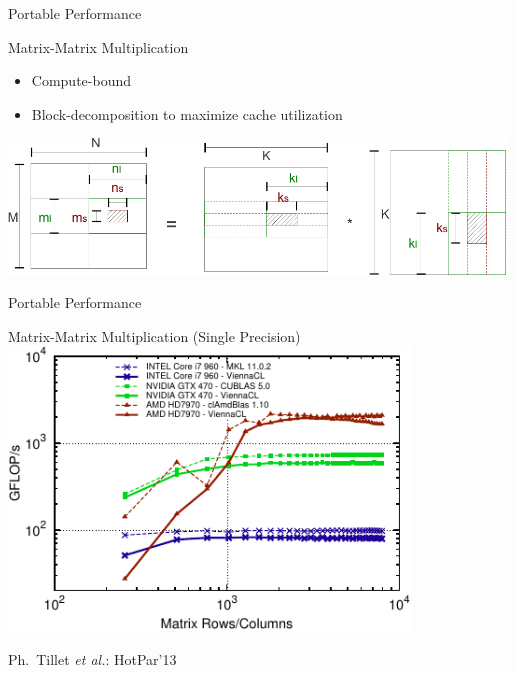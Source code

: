 


\begin{frame}{Portable Performance}
  \begin{block}{Matrix-Matrix Multiplication}
    \begin{itemize}
     \item Compute-bound
     \item Block-decomposition to maximize cache utilization
    \end{itemize}
  \end{block}
  
  \begin{center}
   \includegraphics[width=0.99\textwidth]{figures/MatrixMatrixProduct}
  \end{center}


\end{frame}


\begin{frame}{Portable Performance}
  \begin{center}
  Matrix-Matrix Multiplication (Single Precision) \\
  \includegraphics[width=0.8\textwidth]{figures/sgemm}
  \end{center} 
  
  {\small Ph.~Tillet \textit{et al.}: HotPar'13}
\end{frame}

